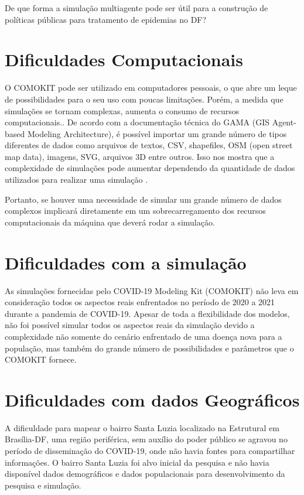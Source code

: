De que forma a simulação multiagente pode ser útil para a construção de políticas públicas para tratamento de epidemias no DF?

\section{Dificuldades Computacionais}

O COMOKIT pode ser utilizado em computadores pessoais, o que abre um leque de possibilidades para o seu uso com poucas limitações. Porém, a medida que simulações se tornam complexas, aumenta o consumo de recursos computacionais.. De acordo com a documentação técnica do GAMA (GIS Agent-based Modeling Architecture), é possível importar um grande número de tipos diferentes de dados como arquivos de textos, CSV, shapefiles, OSM (open street map data), imagens, SVG, arquivos 3D entre outros. Isso nos mostra que a complexidade de simulações pode aumentar dependendo da quantidade de dados utilizados para realizar uma simulação \cite{gamaplataform} .

Portanto, se houver uma necessidade de simular um grande número de dados complexos implicará diretamente em um sobrecarregamento dos recursos computacionais da máquina que deverá rodar a simulação.


\section{Dificuldades com a  simulação}

As simulações fornecidas pelo COVID-19 Modeling Kit (COMOKIT) não leva em consideração todos os aspectos reais enfrentados no período de 2020 a 2021 durante a pandemia de COVID-19. Apesar de toda a flexibilidade dos modelos, não foi possível simular todos os aspectos reais da simulação devido a complexidade não somente do cenário enfrentado de uma doença nova para a população, mas também do grande número de possibilidades e parâmetros que o COMOKIT fornece.

\section{Dificuldades com dados Geográficos}

A dificuldade para mapear o bairro Santa Luzia localizado na Estrutural em Brasília-DF, uma região periférica, sem auxílio do poder público se agravou no período de disseminação do COVID-19, onde não havia fontes para compartilhar informações. O bairro Santa Luzia foi alvo inicial da pesquisa e não havia disponível dados demográficos e dados populacionais para desenvolvimento da pesquisa e simulação.


